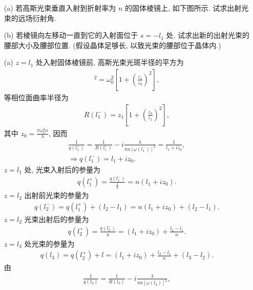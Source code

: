 \documentclass{note}
\begin{document}
\begin{exe}
    \begin{itemize}
        \item[(a)] 若高斯光束垂直入射到折射率为 $n$ 的固体棱镜上, 如下图所示.
        试求出射光束的远场衍射角.
        \item[(b)] 若棱镜向左移动一直到它的入射面位于 $s=-l_1$ 处. 试求出新的出射光束的腰部大小及腰部位置. (假设晶体足够长, 以致光束的腰部位于晶体内.)
    \end{itemize}
\end{exe}
\begin{sol}
    \begin{itemize}
        \item[(a)] $z=l_1$ 处入射固体棱镜前, 高斯光束光斑半径的平方为
        \begin{align}
            [\omega(l_1^-)]^2=\omega_0^2\left[1+\left(\frac{z_1}{z_0}\right)^2\right],
        \end{align}
        等相位面曲率半径为
        \begin{align}
            R(l_1^-)=z_1\left[1+\left(\frac{z_0}{z_1}\right)^2\right],
        \end{align}
        其中 $z_0=\frac{\pi\omega_0^2n}{\lambda}$, 因而
        \begin{gather}
            \frac{1}{q(l_1^-)}=\frac{1}{R(l_1^-)}-i\frac{\lambda}{\pi n[\omega(l_1^-)]^2}=\frac{1}{l_1+iz_0},\\
            \Longrightarrow q(l_1^-)=l_1+iz_0.
        \end{gather}
        $z=l_1$ 处, 光束入射后的参量为
        \begin{align}
            q(l_1^+)=\frac{q(l_1^-)}{\frac{1}{n}}=n(l_1+iz_0).
        \end{align}
        $z=l_2$ 出射前光束的参量为
        \begin{align}
            q(l_2^-)=q(l_1^+)+(l_2-l_1)=n(l_1+iz_0)+(l_2-l_1).
        \end{align}
        $z=l_2$ 光束出射后的参量为
        \begin{align}
            q(l_2^+)=\frac{q(l_2^-)}{n}=(l_1+iz_0)+\frac{l_2-l_1}{n}.
        \end{align}
        $z=l_3$ 处光束的参量为
        \begin{align}
            q(l_3)=q(l_2^+)+l=(l_1+iz_0)+\frac{l_2-l_1}{n}+(l_3-l_2).
        \end{align}
        由
        \begin{align}
            \frac{1}{q(l_3)}=\frac{1}{R(l_3)}-i\frac{\lambda}{\pi n[\omega(l_3)]^2},

\end{align}
\end{itemize}
\end{sol}
\end{document}
